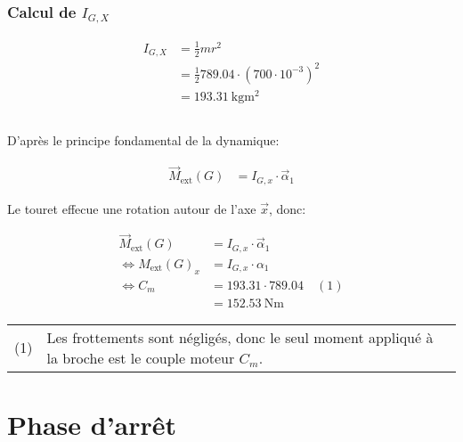 \documentclass{article}
\begin{document}
\subsubsection{Calcul de $I_{G,X}$}

\begin{equation*}
  \begin{split}
    I_{G,X} &= \frac{1}{2}m r^2 \\
            &= \frac{1}{2}789.04 \cdot (700\cdot10^{-3})^2 \\
            &= \SI{193.31}{\kilo\gram\meter\squared}
  \end{split}
\end{equation*}

\subsection{}

D'après le principe fondamental de la dynamique:

\begin{equation*}
  \begin{split}
    \vec M_{\text{ext}}(G) &= I_{G,x} \cdot \vec \alpha_1
  \end{split}
\end{equation*}

Le touret effecue une rotation autour de l'axe $\vec x$, donc:

\begin{equation*}
  \begin{split}
    \vec M_{\text{ext}}(G) &= I_{G,x} \cdot \vec \alpha_1 \\
    \iff M_{\text{ext}}(G)_x &= I_{G,x} \cdot \alpha_1 \\
    \iff C_m &= 193.31 \cdot 789.04\quad(1)\\
    &= \SI{152.53}{\newton\meter}
  \end{split}
\end{equation*}

\begin{tabular}{ll}
  (1) & Les frottements sont négligés, donc le seul moment appliqué à la broche est le couple moteur $C_m$.
\end{tabular}

\section{Phase d'arrêt}
\subsection{}
\end{document}
